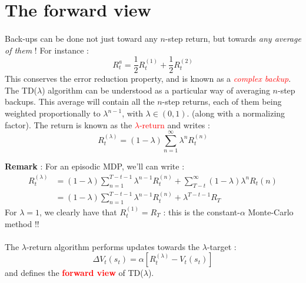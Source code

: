 \documentclass[a4paper]{article}
\newcommand\tdl{TD($\lambda$)}
\begin{document}
	\section{The forward view}
	{
		\paragraph{} Back-ups can be done not just toward any $n$-step return, but towards \emph{any average of them} ! For instance : 
		$$
			R_t^a = \frac{1}{2}R_t^{(1)} + \frac{1}{2}R_t^{(2)}
		$$
		This conserves the error reduction property, and is known as a \emph{\textcolor{red}{complex backup}}. The \tdl{} algorithm can be understood as a particular way of averaging $n$-step backups. This average will contain all the $n$-step returns, each of them being weighted proportionally to $\lambda^{n-1}$, with $\lambda\in(0,1)$. (along with a normalizing factor). The return is known as the \textcolor{red}{$\lambda$-return} and writes : 
		\begin{equation}
			R_t^{(\lambda)} = (1-\lambda) \sum_{n=1}^\infty \lambda^n R_t^{(n	)}
		\end{equation}
		
		\begin{leftbar}
				\noindent \sffamily 
				\textbf{Remark} : For an episodic MDP, we'll can write : 
				\begin{equation}
					\begin{aligned}
						R_t^{(\lambda)} &= (1-\lambda) \sum_{n=1}^{T-t-1} \lambda^{n-1}R_t^{(n)} + \sum_{T-t}^\infty (1-\lambda)\lambda^nR_t{(n)} \\
									&= (1-\lambda) \sum_{n=1}^{T-t-1} \lambda^{n-1}R_t^{(n)} + \lambda^{T-t-1} R_T
					\end{aligned}
				\end{equation}	
				For $\lambda=1$, we clearly have that $R_t^{(1)} = R_T$ : this is the constant-$\alpha$ Monte-Carlo method !! 
		\end{leftbar}
		
		\paragraph{} The $\lambda$-return algorithm performs updates towards the $\lambda$-target : 
		\begin{equation}
			\Delta V_t(s_t) = \alpha\left[ R_t^{(\lambda)} - V_t(s_t)\right]
		\end{equation}
		and defines the \textcolor{red}{\textbf{forward view}} of TD($\lambda$). 
	}
\end{document}

